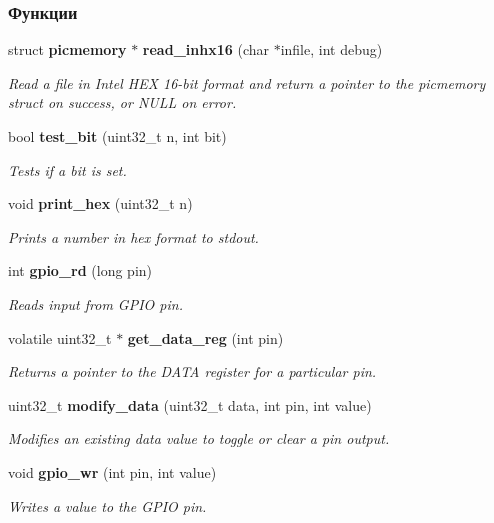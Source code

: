 \subsubsection*{Функции}
\begin{DoxyCompactItemize}
\item 
struct \textbf{ picmemory} $\ast$ \textbf{ read\+\_\+inhx16} (char $\ast$infile, int debug)
\begin{DoxyCompactList}\small\item\em Read a file in Intel H\+EX 16-\/bit format and return a pointer to the picmemory struct on success, or N\+U\+LL on error. \end{DoxyCompactList}\item 
bool \textbf{ test\+\_\+bit} (uint32\+\_\+t n, int bit)
\begin{DoxyCompactList}\small\item\em Tests if a bit is set. \end{DoxyCompactList}\item 
void \textbf{ print\+\_\+hex} (uint32\+\_\+t n)
\begin{DoxyCompactList}\small\item\em Prints a number in hex format to stdout. \end{DoxyCompactList}\item 
int \textbf{ gpio\+\_\+rd} (long pin)
\begin{DoxyCompactList}\small\item\em Reads input from G\+P\+IO pin. \end{DoxyCompactList}\item 
volatile uint32\+\_\+t $\ast$ \textbf{ get\+\_\+data\+\_\+reg} (int pin)
\begin{DoxyCompactList}\small\item\em Returns a pointer to the D\+A\+TA register for a particular pin. \end{DoxyCompactList}\item 
uint32\+\_\+t \textbf{ modify\+\_\+data} (uint32\+\_\+t data, int pin, int value)
\begin{DoxyCompactList}\small\item\em Modifies an existing data value to toggle or clear a pin output. \end{DoxyCompactList}\item 
void \textbf{ gpio\+\_\+wr} (int pin, int value)
\begin{DoxyCompactList}\small\item\em Writes a value to the G\+P\+IO pin. \end{DoxyCompactList}\item 

\end{DoxyCompactItemize}
